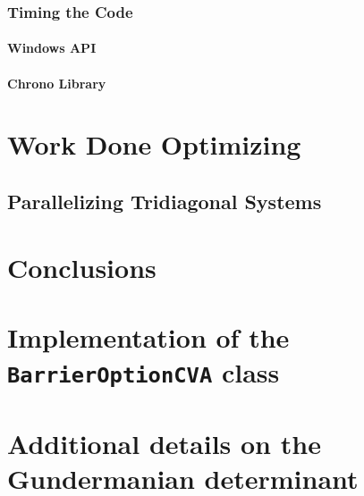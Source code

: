 \documentclass[12pt, oneside]{book}
\theoremstyle{plain}
\theoremstyle{definition}
\begin{document}
\subsection{Timing the Code}
\subsubsection{Windows API}
\lipsum[5]
\subsubsection{Chrono Library}
\lipsum[5]

\chapter{Work Done Optimizing}

\section{Parallelizing Tridiagonal Systems}


\chapter{Conclusions}


\appendix
\chapter{Implementation of the {\tt BarrierOptionCVA} class}
\lipsum[100]
\chapter[shorter running title]{Additional details on the Gundermanian determinant}
\lipsum[100]
\end{document}
